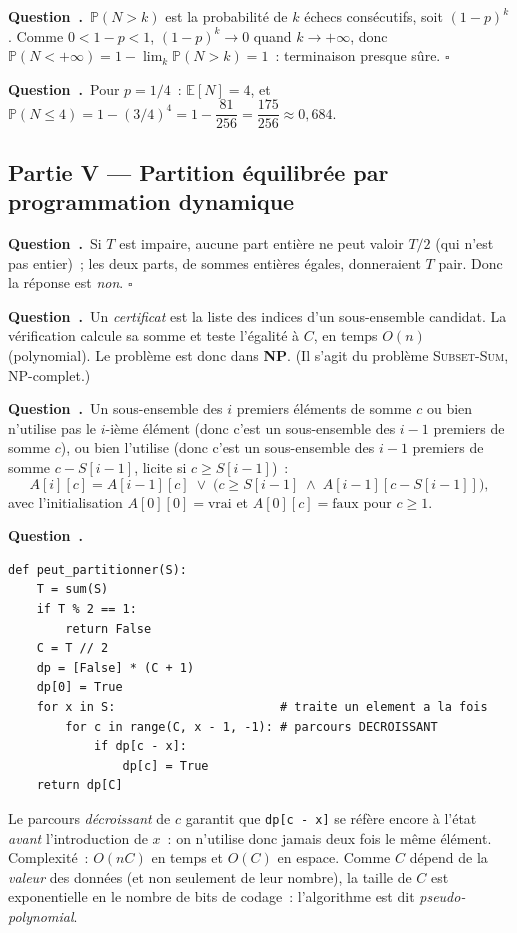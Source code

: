 \documentclass[11pt,a4paper]{article}
\newcounter{qcnt}
\newcommand{\Q}{\medskip\par\stepcounter{qcnt}\noindent\textbf{Question~\theqcnt.}~}
\newcommand{\code}[1]{\lstinline!#1!}
\begin{document}
\Q $\mathbb{P}(N > k)$ est la probabilité de $k$ échecs consécutifs, soit $(1-p)^{k}$. Comme
$0 < 1-p < 1$, $(1-p)^{k} \to 0$ quand $k \to +\infty$, donc
$\mathbb{P}(N < +\infty) = 1 - \lim_k \mathbb{P}(N>k) = 1$~: terminaison presque sûre. $\square$

\Q Pour $p = 1/4$~: $\mathbb{E}[N] = 4$, et
$\mathbb{P}(N \le 4) = 1 - (3/4)^{4} = 1 - \dfrac{81}{256} = \dfrac{175}{256}
\approx 0{,}684.$

\subsection*{Partie V --- Partition équilibrée par programmation dynamique}

\Q Si $T$ est impaire, aucune part entière ne peut valoir $T/2$ (qui n'est pas entier)~; les deux
parts, de sommes entières égales, donneraient $T$ pair. Donc la réponse est \emph{non}. $\square$

\Q Un \emph{certificat} est la liste des indices d'un sous-ensemble candidat. La vérification
calcule sa somme et teste l'égalité à $C$, en temps $O(n)$ (polynomial). Le problème est donc
dans \textbf{NP}. (Il s'agit du problème \textsc{Subset-Sum}, NP-complet.)

\Q Un sous-ensemble des $i$ premiers éléments de somme $c$ ou bien n'utilise pas le $i$-ième
élément (donc c'est un sous-ensemble des $i-1$ premiers de somme $c$), ou bien l'utilise (donc
c'est un sous-ensemble des $i-1$ premiers de somme $c - S[i-1]$, licite si $c \ge S[i-1]$)~:
$$A[i][c] = A[i-1][c] \;\lor\; \bigl(c \ge S[i-1] \;\land\; A[i-1][c - S[i-1]]\bigr),$$
avec l'initialisation $A[0][0] = \text{vrai}$ et $A[0][c] = \text{faux}$ pour $c \ge 1$.

\Q
\begin{lstlisting}
def peut_partitionner(S):
    T = sum(S)
    if T % 2 == 1:
        return False
    C = T // 2
    dp = [False] * (C + 1)
    dp[0] = True
    for x in S:                       # traite un element a la fois
        for c in range(C, x - 1, -1): # parcours DECROISSANT
            if dp[c - x]:
                dp[c] = True
    return dp[C]
\end{lstlisting}
Le parcours \emph{décroissant} de $c$ garantit que \code{dp[c - x]} se réfère encore à l'état
\emph{avant} l'introduction de $x$~: on n'utilise donc jamais deux fois le même élément.
Complexité~: $O(nC)$ en temps et $O(C)$ en espace. Comme $C$ dépend de la \emph{valeur} des
données (et non seulement de leur nombre), la taille de $C$ est exponentielle en le nombre de bits
de codage~: l'algorithme est dit \emph{pseudo-polynomial}.
\end{document}
